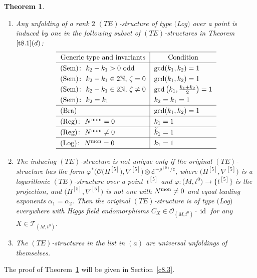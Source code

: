 \documentclass[10pt,a4paper]{amsart}
\numberwithin{equation}{section}
\numberwithin{figure}{section}
\newcommand{\N}{{\mathbb N}}
\newcommand{\EE}{{\mathcal E}}
\newcommand{\OO}{{\mathcal O}}
\newcommand{\TT}{{\mathcal T}}
\newcommand{\www}{\widetilde}
\newcommand{\nnn}{\nabla}
\DeclareMathOperator{\id}{id}
\newtheorem{Theorem}{Theorem}[section]
\begin{document}
\begin{Theorem}\label{t8.5}\quad
\begin{enumerate}\itemsep=0pt
\item[$(a)$] Any unfolding of a rank $2$ $(TE)$-structure of type $($Log$)$
over a point is induced by one in the
following subset of $(TE)$-structures in Theorem~$\ref{t8.1}(d)$:
\begin{gather}\label{8.12}
\def\arraystretch{1.25}
\begin{tabular}{l|l}
\hline
\multicolumn{1}{c|}{Generic type and invariants} & \multicolumn{1}{c}{Condition}
\\ \hline
$($Sem$)\colon\ k_2-k_1>0$ odd & $\gcd(k_1,k_2)=1$
\\
$($Sem$)\colon\ k_2-k_1\in 2\N$, $\zeta= 0$ & $\gcd(k_1,k_2)=1$
\\
$($Sem$)\colon\ k_2-k_1\in 2\N$, $\zeta\neq 0$ &$\gcd\big(k_1,\frac{k_1+k_2}{2}\big)=1$
\\
$($Sem$)\colon\ k_2=k_1$ & $k_2=k_1=1 $
\\ \hline
$($Bra$)$ & $\gcd(k_1,k_2)=1$
\\ \hline
$($Reg$)\colon\ N^{\rm mon}=0$ & $k_1=1$
\\ \hline
$($Reg$)\colon\ N^{\rm mon}\neq 0$ & $\www k_1=1$
\\ \hline
$($Log$)\colon\ N^{\rm mon}=0$ &$ k_1=1$
\\
\hline
\end{tabular}
\end{gather}

\item[$(b)$] The inducing $(TE)$-structure is not unique only if
the original $(TE)$-structure has the form
$\varphi^*\big(\OO\big(H^{[5]}\big),\nnn^{[5]}\big)\otimes \EE^{-\rho^{(0)}/z}$,
where $\big(H^{[5]},\nnn^{[5]}\big)$ is a logarithmic
$(TE)$-structure over a point~$t^{[5]}$ and
$\varphi\colon \big(M,t^0\big)\to\big\{t^{[5]}\big\}$ is the projection,
and $\big(H^{[5]},\nnn^{[5]}\big)$ is not one with $N^{\rm mon}\neq 0$
and equal leading exponents $\alpha_1=\alpha_2$.
Then the original $(TE)$-structure is of type $($Log$)$
everywhere with Higgs field endomorphisms
$C_X\in\OO_{(M,t^0)}\cdot\id$ for any $X\in \TT_{(M,t^0)}$.

\item[$(c)$] The $(TE)$-structures in the list in $(a)$ are universal
unfoldings of themselves.
\end{enumerate}
\end{Theorem}


The proof of Theorem~\ref{t8.5} will be given in
Section~\ref{c8.3}.
\end{document}
